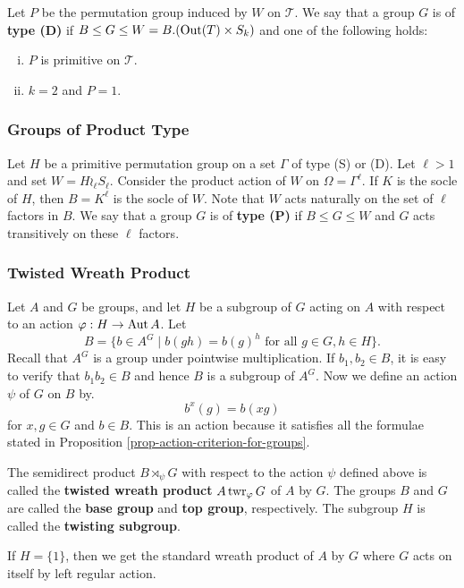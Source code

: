 Let $P$ be the permutation group induced by $W$ on $\mathcal{T}$. We say that a group $G$ is of \textbf{type (D)} if $B \leq G \leq W = B.(\operatorname{Out}(T)\times S_k)$ and one of the following holds:
\begin{enumerate}[(i)]
	\item $P$ is primitive on $\mathcal{T}$.
	\item $k=2$ and $P=1$.
\end{enumerate}

\subsubsection{Groups of Product Type}  Let $H$ be a primitive permutation group on a set $\Gamma$ of type (S) or (D). Let $\ell>1$ and set $W = H\wr_\ell S_\ell$. Consider the product action of $W$ on $\Omega = \Gamma^\ell$. If $K$ is the socle of $H$, then $B=K^\ell$ is the socle of $W$. Note that $W$ acts naturally on the set of $\ell$ factors in $B$.  We say that a group $G$ is of \textbf{type (P)} if $B\leq G\leq W$ and $G$ acts transitively on these $\ell$ factors.


\subsubsection{Twisted Wreath Product} 
Let $A$ and $G$ be groups, and let $H$ be a subgroup of $G$ acting on $A$ with respect to an action $\varphi:H\rightarrow \operatorname{Aut} A$. Let 
\begin{equation*}
	B = \{b\in A^G\mid b(gh) = b(g)^h\text{ for all }g\in G,h\in H\}.
\end{equation*}
Recall that $A^G$ is a group under pointwise multiplication. If $b_1,b_2\in B$, it is easy to verify that $b_1b_2\in B$ and hence $B$ is a subgroup of $A^G$. Now we define an action $\psi$ of $G$ on $B$ by. 
\begin{equation*}
	b^x(g) = b(xg)
\end{equation*}
for $x,g\in G$ and $b\in B$. This is an action because it satisfies all the formulae stated in Proposition \ref{prop-action-criterion-for-groups}.

\begin{definition}
	The semidirect product $B\rtimes_\psi G$ with respect to the action $\psi$ defined above is called the \textbf{twisted wreath product} $A\operatorname{twr}_\varphi G$ of $A$ by $G$. The groups $B$ and $G$ are called the \textbf{base group} and \textbf{top group}, respectively. The subgroup $H$ is called the \textbf{twisting subgroup}.
\end{definition}
\begin{remark}
	If $H = \{1\}$, then we get the standard wreath product of $A$ by $G$ where $G$ acts on itself by left regular action.
\end{remark}

